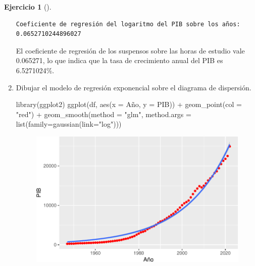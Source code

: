 \documentclass[
  a4paper,
]{scrreport}
\newenvironment{Shaded}{\begin{snugshade}}{\end{snugshade}}
\newcommand{\AttributeTok}[1]{\textcolor[rgb]{0.40,0.45,0.13}{#1}}
\newcommand{\FunctionTok}[1]{\textcolor[rgb]{0.28,0.35,0.67}{#1}}
\newcommand{\NormalTok}[1]{\textcolor[rgb]{0.00,0.23,0.31}{#1}}
\newcommand{\SpecialCharTok}[1]{\textcolor[rgb]{0.37,0.37,0.37}{#1}}
\newcommand{\StringTok}[1]{\textcolor[rgb]{0.13,0.47,0.30}{#1}}
\theoremstyle{definition}
\newtheorem{exercise}{Ejercicio}[chapter]
\theoremstyle{remark}
\begin{document}
\begin{exercise}[]
\begin{enumerate}
\begin{tcolorbox}
\begin{verbatim}
Coeficiente de regresión del logaritmo del PIB sobre los años: 0.0652710244896027
\end{verbatim}

  El coeficiente de regresión de los suspensos sobre las horas de
  estudio vale 0.065271, lo que indica que la tasa de crecimiento anual
  del PIB es 6.5271024\%.

  \end{tcolorbox}
\item
  Dibujar el modelo de regresión exponencial sobre el diagrama de
  dispersión.

  \begin{tcolorbox}[enhanced jigsaw, coltitle=black, left=2mm, colback=white, leftrule=.75mm, toptitle=1mm, breakable, bottomrule=.15mm, titlerule=0mm, bottomtitle=1mm, title=\textcolor{quarto-callout-tip-color}{\faLightbulb}\hspace{0.5em}{Solución}, arc=.35mm, toprule=.15mm, rightrule=.15mm, colframe=quarto-callout-tip-color-frame, opacityback=0, colbacktitle=quarto-callout-tip-color!10!white, opacitybacktitle=0.6]

\begin{Shaded}
\begin{Highlighting}[]
\FunctionTok{library}\NormalTok{(ggplot2)}
\FunctionTok{ggplot}\NormalTok{(df, }\FunctionTok{aes}\NormalTok{(}\AttributeTok{x =}\NormalTok{ Año, }\AttributeTok{y =}\NormalTok{ PIB)) }\SpecialCharTok{+}
        \FunctionTok{geom\_point}\NormalTok{(}\AttributeTok{col =} \StringTok{"red"}\NormalTok{) }\SpecialCharTok{+}
        \FunctionTok{geom\_smooth}\NormalTok{(}\AttributeTok{method =} \StringTok{"glm"}\NormalTok{, }\AttributeTok{method.args =} \FunctionTok{list}\NormalTok{(}\AttributeTok{family=}\FunctionTok{gaussian}\NormalTok{(}\AttributeTok{link=}\StringTok{"log"}\NormalTok{)))}
\end{Highlighting}
\end{Shaded}

  \begin{figure}[H]

  {\centering \includegraphics{05-regresion_files/figure-pdf/unnamed-chunk-29-1.pdf}

}
\end{figure}
\end{tcolorbox}
\end{enumerate}
\end{exercise}
\end{document}
